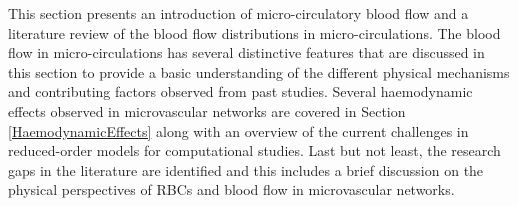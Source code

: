 \noindent This section presents an introduction of micro-circulatory blood flow and a literature review of the blood flow distributions in micro-circulations. The blood flow in micro-circulations has several distinctive features\cite{BloodFlowSecomb, AnnualReview} that are discussed in this section to provide a basic understanding of the different physical mechanisms and contributing factors observed from past studies. Several haemodynamic effects observed in microvascular networks are covered in Section \ref{HaemodynamicEffects} along with an overview of the current challenges in reduced-order models for computational studies. Last but not least, the research gaps in the literature are identified and this includes a brief discussion on the physical perspectives of RBCs and blood flow in microvascular networks. 